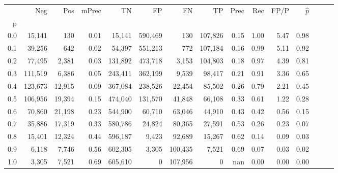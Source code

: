 \begin{tabular}{rrrrrrrrrrrrrrr}
\toprule
{} &      Neg &     Pos & mPrec &       TN &       FP &       FN &       TP &  Prec &   Rec &  FP/P & $\hat{p}$ \\
p   &          &         &       &          &          &          &          &       &       &       &           \\
\midrule
0.0 &   15,141 &     130 &  0.01 &   15,141 &  590,469 &      130 &  107,826 &  0.15 &  1.00 &  5.47 &      0.98 \\
0.1 &   39,256 &     642 &  0.02 &   54,397 &  551,213 &      772 &  107,184 &  0.16 &  0.99 &  5.11 &      0.92 \\
0.2 &   77,495 &   2,381 &  0.03 &  131,892 &  473,718 &    3,153 &  104,803 &  0.18 &  0.97 &  4.39 &      0.81 \\
0.3 &  111,519 &   6,386 &  0.05 &  243,411 &  362,199 &    9,539 &   98,417 &  0.21 &  0.91 &  3.36 &      0.65 \\
0.4 &  123,673 &  12,915 &  0.09 &  367,084 &  238,526 &   22,454 &   85,502 &  0.26 &  0.79 &  2.21 &      0.45 \\
0.5 &  106,956 &  19,394 &  0.15 &  474,040 &  131,570 &   41,848 &   66,108 &  0.33 &  0.61 &  1.22 &      0.28 \\
0.6 &   70,860 &  21,198 &  0.23 &  544,900 &   60,710 &   63,046 &   44,910 &  0.43 &  0.42 &  0.56 &      0.15 \\
0.7 &   35,886 &  17,319 &  0.33 &  580,786 &   24,824 &   80,365 &   27,591 &  0.53 &  0.26 &  0.23 &      0.07 \\
0.8 &   15,401 &  12,324 &  0.44 &  596,187 &    9,423 &   92,689 &   15,267 &  0.62 &  0.14 &  0.09 &      0.03 \\
0.9 &    6,118 &   7,746 &  0.56 &  602,305 &    3,305 &  100,435 &    7,521 &  0.69 &  0.07 &  0.03 &      0.02 \\
1.0 &    3,305 &   7,521 &  0.69 &  605,610 &        0 &  107,956 &        0 &   nan &  0.00 &  0.00 &      0.00 \\
\bottomrule
\end{tabular}
